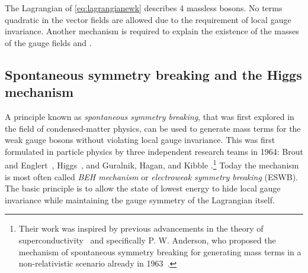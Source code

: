 \noindent The Lagrangian of \cref{eq:lagrangianewk} describes 4 massless bosons. No terms quadratic in the vector fields are allowed due to the requirement of local gauge invariance.
Another mechanism is required to explain the existence of the masses of the gauge fields \Wpm and \Zboson.




\subsection{Spontaneous symmetry breaking and the Higgs mechanism}
\label{subsec:ewsymbreaking}

A principle known as \emph{spontaneous symmetry breaking}, that was first explored in the field of condensed-matter physics, can be used to generate mass terms for the weak gauge bosons without violating local gauge invariance.
This was first formulated in particle physics by three independent research teams in 1964: Brout and Englert~\cite{PhysRevLett.13.321}, Higgs~\cite{PhysRevLett.13.508,HIGGS1964132}, and Guralnik, Hagan, and Kibble \cite{PhysRevLett.13.585}.\footnote{Their work was inspired by previous advancements in the theory of superconductivity~\cite{PhysRev.108.1175} and specifically P. W. Anderson, who proposed the mechanism of spontaneous symmetry breaking for generating mass terms in a non-relativistic scenario already in 1963~\cite{PhysRev.130.439}.}
Today the mechanism is most often called \emph{BEH mechanism} or \emph{electroweak symmetry breaking} (ESWB).
The basic principle is to allow the state of lowest energy to hide local gauge invariance while maintaining the gauge symmetry of the Lagrangian itself.


